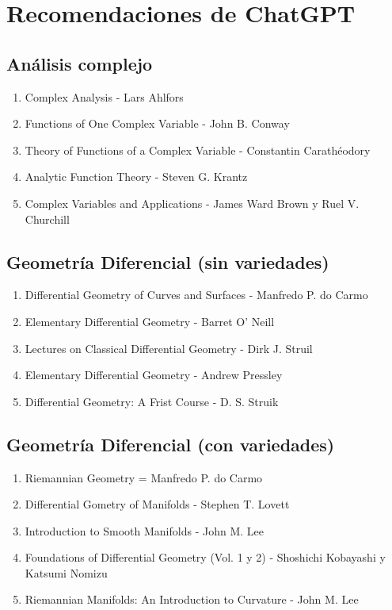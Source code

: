 \documentclass{article}
\begin{document}
\section*{Recomendaciones de ChatGPT}
\subsection*{An\'alisis complejo}
\begin{enumerate}
	\item Complex Analysis - Lars Ahlfors
	\item Functions of One Complex Variable - John B. Conway
	\item Theory of Functions of a Complex Variable - Constantin Carath\'eodory
	\item Analytic Function Theory - Steven G. Krantz
	\item Complex Variables and Applications - James Ward Brown y Ruel V. Churchill
\end{enumerate}
\subsection*{Geometr\'ia Diferencial (sin variedades)}
\begin{enumerate}
	\item Differential Geometry of Curves and Surfaces - Manfredo P. do Carmo
	\item Elementary Differential Geometry - Barret O' Neill
	\item Lectures on Classical Differential Geometry - Dirk J. Struil
	\item Elementary Differential Geometry - Andrew Pressley
	\item Differential Geometry: A Frist Course - D. S. Struik
\end{enumerate}
\subsection*{Geometr\'ia Diferencial (con variedades)}
\begin{enumerate}
	\item Riemannian Geometry = Manfredo P. do Carmo
	\item Differential Gometry of Manifolds - Stephen T. Lovett
	\item Introduction to Smooth Manifolds - John M. Lee
	\item Foundations of Differential Geometry (Vol. 1 y 2) - Shoshichi Kobayashi y Katsumi Nomizu
	\item Riemannian Manifolds: An Introduction to Curvature - John M. Lee
\end{enumerate}
\end{document}
